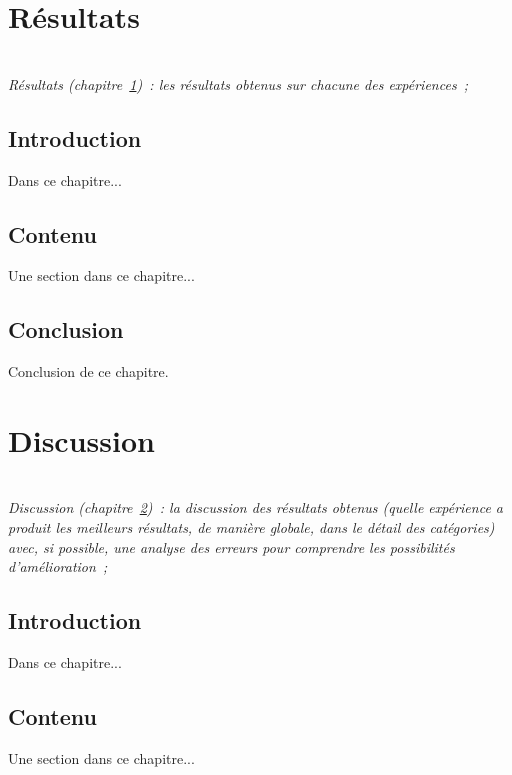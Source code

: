 \documentclass[a4paper,11pt,twoside]{memoir}
\begin{document}

\chapter{Résultats}
\label{chap:resultats}
\minitoc

\textit{\\Résultats (chapitre~\ref{chap:resultats})~: les résultats
obtenus sur chacune des expériences~;}

\section{Introduction}
Dans ce chapitre...

\section{Contenu}
Une section dans ce chapitre...

\section{Conclusion}
Conclusion de ce chapitre.



\chapter{Discussion}
\label{chap:discussion}
\minitoc

\textit{\\Discussion (chapitre~\ref{chap:discussion})~: la discussion des
résultats obtenus (quelle expérience a produit les meilleurs
résultats, de manière globale, dans le détail des catégories) avec,
si possible, une analyse des erreurs pour comprendre les
possibilités d'amélioration~;}

\section{Introduction}
Dans ce chapitre...

\section{Contenu}
Une section dans ce chapitre...
\end{document}
